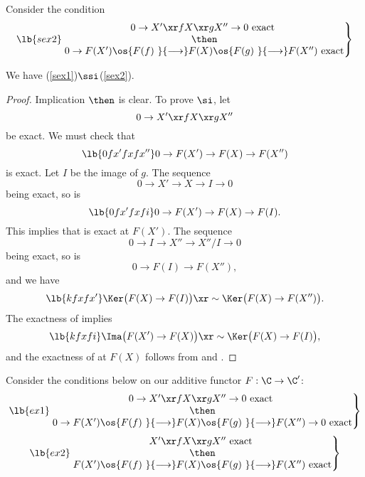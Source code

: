 \documentclass[12pt]{article}
\theoremstyle{remark}
\theoremstyle{definition}
\begin{document}
Consider the condition
\begin{equation}\lb{sex2}
\left.
\begin{matrix}
0\to X'\xr fX\xr gX''\to0\text{ exact }\\ 
\then\\ 
0\to F(X')\os{F(f)\ }{\longrightarrow}F(X)\os{F(g)\ }{\longrightarrow}F(X'')\text{ exact}
\end{matrix}
\right\}
\end{equation}

\begin{lem}
We have (\ref{sex1})$\ssi$(\ref{sex2}). 
\end{lem}

\begin{proof}
Implication $\then$ is clear. To prove $\si$, let 
$$
0\to X'\xr fX\xr gX''
$$
be exact. We must check that 
\begin{equation}\lb{0fx'fxfx''}
0\to F(X')\to F(X)\to F(X'')
\end{equation} 
is exact. Let $I$ be the image of $g$. The sequence 
$$ 
0\to X'\to X\to I\to0
$$ 
being exact, so is 
\begin{equation}\lb{0fx'fxfi}
0\to F(X')\to F(X)\to F(I).
\end{equation} 
This implies that  is exact at $F(X')$. The sequence 
$$ 
0\to I\to X''\to X''/I\to0
$$  
being exact, so is 
$$ 
0\to F(I)\to F(X''),
$$  
and we have 
\begin{equation}\lb{kfxfx'}
\Ker\big(F(X)\to F(I)\big)\xr\sim\Ker\big(F(X)\to F(X'')\big).
\end{equation}
The exactness of  implies 
\begin{equation}\lb{kfxfi}
\Ima\big(F(X')\to F(X)\big)\xr\sim\Ker\big(F(X)\to F(I)\big), 
\end{equation} 
and the exactness of  at $F(X)$ follows from  and . 
\end{proof} 

Consider the conditions below on our additive functor $F:\C\to\C'$:
\begin{equation}\lb{ex1}
\left.
\begin{matrix}
0\to X'\xr fX\xr gX''\to0\text{ exact }\\ 
\then\\ 
0\to F(X')\os{F(f)\ }{\longrightarrow}F(X)\os{F(g)\ }{\longrightarrow}F(X'')\to0\text{ exact}
\end{matrix}
\right\}
\end{equation}
%
\begin{equation}\lb{ex2}
\left.
\begin{matrix}
X'\xr fX\xr gX''\text{ exact }\\ 
\then\\ 
F(X')\os{F(f)\ }{\longrightarrow}F(X)\os{F(g)\ }{\longrightarrow}F(X'')\text{ exact}
\end{matrix}
\right\}
\end{equation}
\end{document}
